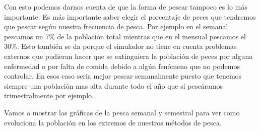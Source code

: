 \documentclass[]{article}
\begin{document}
Con esto podemos darnos cuenta de que la forma de pescar tampoco es lo más importante. Es más importante saber elegir el porcentaje de peces que tendremos que pescar según nuestra frecuencia de pesca. Por ejemplo en el semanal pescamos un 7\% de la población total mientras que en el mensual pescamos el 30\%. Esto también se da porque el simulador no tiene en cuenta problemas externos que pudieran hacer que se extinguiera la población de peces por alguna enfermedad o por falta de comida debido a algún fenómeno que no podemos controlar. En esos caso seria mejor pescar semanalmente puesto que tenemos siempre una población mas alta durante todo el año que si pescáramos trimestralmente por ejemplo.


Vamos a mostrar las gráficas de la pesca semanal y semestral para ver como evoluciona la población en los extremos de nuestros métodos de pesca.
\end{document}
